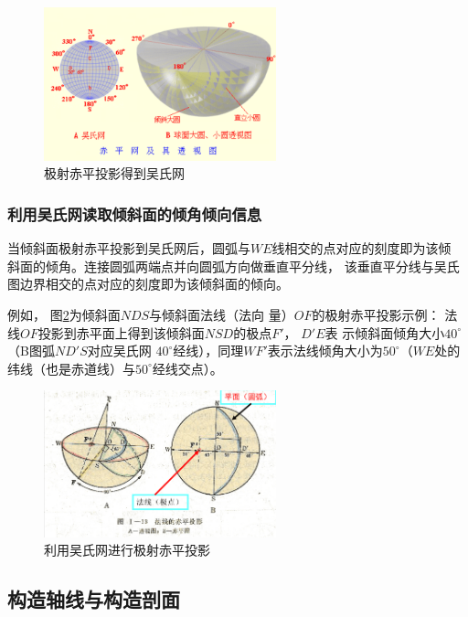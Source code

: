\documentclass[a4paper,twoside]{ctexart}
\begin{document}
\begin{figure}[htbp]
  \centering
    \includegraphics[width=0.6\textwidth]{pic/极射赤平投影得到吴氏网.png}
  \caption{极射赤平投影得到吴氏网}
  \label{fig:极射赤平投影得到吴氏网}
\end{figure}

\subsubsection{利用吴氏网读取倾斜面的倾角倾向信息}

当倾斜面极射赤平投影到吴氏网后，圆弧与$WE$线相交的点对应的刻度即为该倾
斜面的倾角。连接圆弧两端点并向圆弧方向做垂直平分线，
该垂直平分线与吴氏图边界相交的点对应的刻度即为该倾斜面的倾向。

例如，
图\ref{fig:利用吴氏网进行极射赤平投影}为倾斜面$NDS$与倾斜面法线（法向
量）$OF$的极射赤平投影示例：
法线$OF$投影到赤平面上得到该倾斜面$NSD$的极点$F'$， 
$D'E$表 示倾斜面倾角大小$40^{\circ}$（B图弧$ND'S$对应吴氏网
$40^{\circ}$经线），同理$WF'$表示法线倾角大小为$50^{\circ}$（$WE$处的
纬线（也是赤道线）与$50^{\circ}$经线交点）。 

\begin{figure}[htbp]
  \centering
    \includegraphics[width=0.6\textwidth]{pic/平面法向量直线投影.png}
  \caption{利用吴氏网进行极射赤平投影}
  \label{fig:利用吴氏网进行极射赤平投影}
\end{figure}

\subsection{构造轴线与构造剖面}
\end{document}
